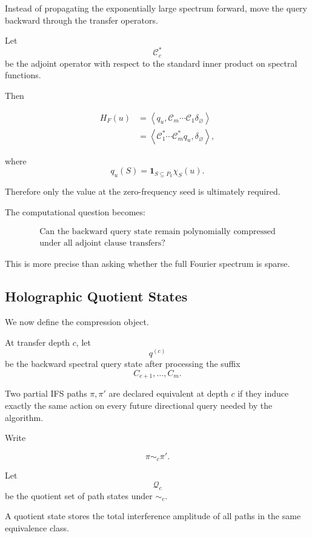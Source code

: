 \documentclass[11pt]{article}
\theoremstyle{plain}
\theoremstyle{definition}
\begin{document}
Instead of propagating the exponentially large spectrum forward, move the
query backward through the transfer operators.

Let
\[
    \mathcal{C}_c^\ast
\]
be the adjoint operator with respect to the standard inner product on
spectral functions.

Then

\[
\begin{aligned}
H_F(u)
&=
\left\langle
    q_u,
    \mathcal{C}_m
    \cdots
    \mathcal{C}_1
    \delta_{\varnothing}
\right\rangle
\\
&=
\left\langle
    \mathcal{C}_1^\ast
    \cdots
    \mathcal{C}_m^\ast
    q_u,
    \delta_{\varnothing}
\right\rangle,
\end{aligned}
\]

where
\[
    q_u(S)
    =
    \mathbf{1}_{S\subseteq P_k}\chi_S(u).
\]

Therefore only the value at the zero-frequency seed is ultimately required.

The computational question becomes:

\[
\boxed{\begin{gathered}
\text{Can the backward query state remain polynomially compressed}\\
\text{under all adjoint clause transfers?}
\end{gathered}}
\]

This is more precise than asking whether the full Fourier spectrum is sparse.

\subsection{Holographic Quotient States}

We now define the compression object.

At transfer depth \(c\), let
\[
    q^{(c)}
\]
be the backward spectral query state after processing the suffix
\[
    C_{c+1},\dots,C_m.
\]

Two partial IFS paths \(\pi,\pi'\) are declared equivalent at depth \(c\) if
they induce exactly the same action on every future directional query needed
by the algorithm.

Write

\[
    \pi\sim_c\pi'.
\]

Let
\[
    \mathcal{Q}_c
\]
be the quotient set of path states under \(\sim_c\).

A quotient state stores the total interference amplitude of all paths in the
same equivalence class.
\end{document}
